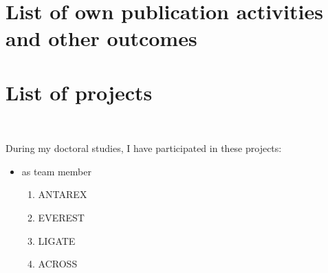 \chapter*{List of own publication activities and other outcomes}
\label{ch:listofstudentsownpublicationactivitiesandotheroutcomes}





\chapter*{List of projects}
\label{ch:listofprojects}~
During my doctoral studies, I have participated in these projects:
\begin{itemize}
	\item as team member
	      \begin{enumerate}
		      \item ANTAREX
		      \item EVEREST
		      \item LIGATE
		      \item ACROSS
	      \end{enumerate}
\end{itemize}

\printbibliography[heading=bibintoc, title={Bibliography}]
